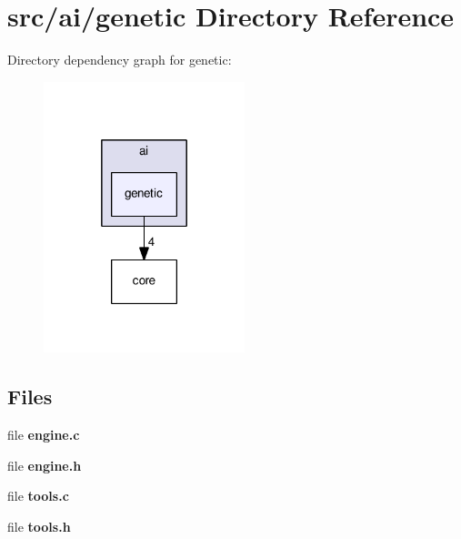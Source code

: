 \section{src/ai/genetic Directory Reference}
\label{dir_43596c0b3cf30b801e31b375b5bbc130}
Directory dependency graph for genetic\+:
\nopagebreak
\begin{figure}[H]
\begin{center}
\leavevmode
\includegraphics[width=166pt]{dir_43596c0b3cf30b801e31b375b5bbc130_dep}
\end{center}
\end{figure}
\subsection*{Files}
\begin{DoxyCompactItemize}
\item 
file \textbf{ engine.\+c}
\item 
file \textbf{ engine.\+h}
\item 
file \textbf{ tools.\+c}
\item 
file \textbf{ tools.\+h}
\end{DoxyCompactItemize}
